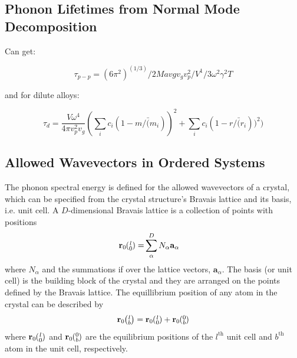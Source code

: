 \documentclass[letterpaper,12pt]{article}
\newcommand{\ab}[2]{\mspace{-4.0mu}\left(\mspace{-8.0mu}\begin{smallmatrix}&\ifthenelse{\equal{#1}{}}{a}{#1} \\&\ifthenelse{\equal{#2}{}}{b}{#2}\end{smallmatrix}\mspace{-3.0mu}\right)}
\begin{document}
\subsection{\label{Subsection_Comp_Details_1}Phonon Lifetimes from Normal Mode Decomposition}

Can get:

\begin{equation}\label{EQ:M:tau_p-p}
\tau_{p-p} = (6 \pi^2)^(1/3)/2 Mavg v_g v_p^2 / V^1/3 \omega^2 \gamma^2 T
\end{equation}

and for dilute alloys:

\begin{equation}\label{EQ:M:tau_d}
\tau_{d} = \frac{V \omega^4}{4 \pi v_p^2 v_g} ( \sum_i c_i(1-m/\bar(m_i))^2 + \sum_i c_i(1-r/\bar(r_i))^2 )
\end{equation}

\subsection{\label{Subsection_Comp_Details_1}Allowed Wavevectors in Ordered Systems}

The phonon spectral energy is defined for the allowed wavevectors of a crystal, which can be specified from the crystal structure's Bravais
lattice and its basis, i.e. unit cell. A $D$-dimensional Bravais lattice is a collection of points with
positions
\begin{equation}\label{crys_pos}
\begin{split}
\mathbf{r}_0\ab{l}{0} =& \sum^D_{\alpha} N_{\alpha}\mathbf{a}_{\alpha}
\end{split}
\end{equation}
where $N_{\alpha}$ and the summations if over the lattice vectors, $\mathbf{a}_{\alpha}$.\cite{ashcroft1976} The basis (or unit cell) is the building block of the crystal and they are arranged on the points defined by the Bravais lattice. The equillibrium position of any atom in the crystal can be described by
\begin{equation}\label{crys_pos2}
\begin{split}
\mathbf{r}_0\ab{l}{b} = \mathbf{r}_0\ab{l}{0} + \mathbf{r}_0\ab{0}{b}
\end{split}
\end{equation}
where $\mathbf{r}_0\ab{l}{0}$ and $\mathbf{r}_0\ab{0}{b}$ are the equilibrium positions of the $l^{\textrm{th}}$ unit cell and $b^{\textrm{th}}$ atom in the unit cell, respectively.
\end{document}
